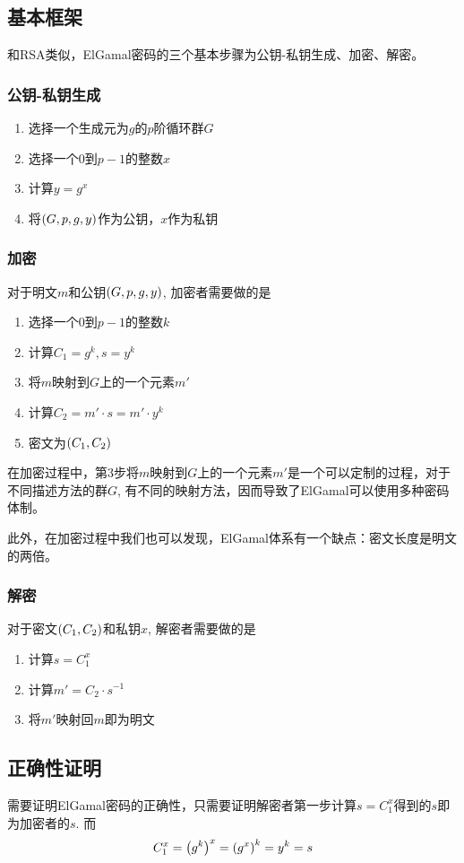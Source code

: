 \subsection{基本框架}
和RSA类似，ElGamal密码的三个基本步骤为公钥-私钥生成、加密、解密。
\subsubsection{公钥-私钥生成}
\begin{enumerate}
	\item 选择一个生成元为$g$的$p$阶循环群$G$
	\item 选择一个$0$到$p-1$的整数$x$
	\item 计算$y=g^x$
	\item 将$\left( {G, p, g, y}\right)$作为公钥，$x$作为私钥
\end{enumerate}
\subsubsection{加密}
对于明文$m$和公钥$\left( {G, p, g, y}\right)$, 加密者需要做的是
\begin{enumerate}
	\item 选择一个$0$到$p-1$的整数$k$
	\item 计算$C_1=g^k, s=y^k$
	\item 将$m$映射到$G$上的一个元素$m'$
	\item 计算$C_2=m'\cdot s=m'\cdot y^k$
	\item 密文为$\left( {C_1, C_2}\right)$
\end{enumerate}

在加密过程中，第3步将$m$映射到$G$上的一个元素$m'$是一个可以定制的过程，对于不同描述方法的群$G$, 有不同的映射方法，因而导致了ElGamal可以使用多种密码体制。\par
此外，在加密过程中我们也可以发现，ElGamal体系有一个缺点：密文长度是明文的两倍。\par

\subsubsection{解密}
对于密文$\left( {C_1, C_2}\right)$和私钥$x$, 解密者需要做的是
\begin{enumerate}
	\item 计算$s=C_1^x$
	\item 计算$m'=C_2\cdot s^{-1}$
	\item 将$m'$映射回$m$即为明文
\end{enumerate}
\subsection{正确性证明}
需要证明ElGamal密码的正确性，只需要证明解密者第一步计算$s=C_1^x$得到的$s$即为加密者的$s$. 而
\[C_1^x=\left( {g^k}\right)^x=\left( {g^x}\right)^k=y^k=s\]

